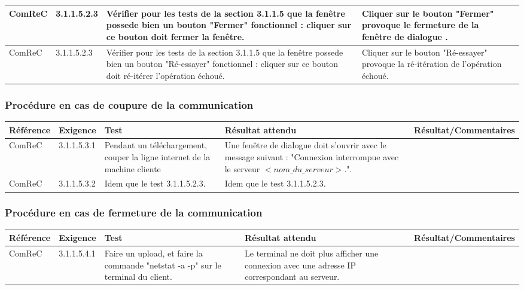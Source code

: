 \documentclass[10pt,a4paper,landscape]{report}
\begin{document}
\begin{center}
\begin{tabular}{|p{2.5cm}|p{2cm}|p{8cm}|p{8cm}|p{5.5cm}|}
		\hline
		ComReC & 3.1.1.5.2.3 & Vérifier pour les tests de la section 3.1.1.5 que la fenêtre possede bien un bouton "Fermer" fonctionnel :  cliquer sur ce bouton doit fermer la fenêtre.& Cliquer sur le bouton "Fermer" provoque le fermeture de la fenêtre de dialogue .&\\
		\hline
		ComReC & 3.1.1.5.2.3 & Vérifier pour les tests de la section 3.1.1.5 que la fenêtre possede bien un bouton "Ré-essayer" fonctionnel :  cliquer sur ce bouton doit ré-itérer l'opération échoué.& Cliquer sur le bouton "Ré-essayer" provoque la ré-itération de l'opération échoué.&\\
		\hline
	\end{tabular}
	\egroup
\end{center}

\subsubsection{Procédure en cas de coupure de la communication}

\begin{center}
	\bgroup
	\def\arraystretch{1.5}
	\begin{tabular}{|p{2.5cm}|p{2cm}|p{8cm}|p{8cm}|p{5.5cm}|}
		\hline
		\rowcolor{gris}Référence & Exigence & Test & Résultat attendu & Résultat/Commentaires\\
		\hline
		ComReC & 3.1.1.5.3.1 & Pendant un téléchargement, couper la ligne internet de la machine cliente & Une fenêtre de dialogue doit s'ouvrir avec le message suivant :   "Connexion interrompue avec le serveur $< nom\_du\_serveur>$.".&\\
		\hline
		ComReC & 3.1.1.5.3.2 & Idem que le test 3.1.1.5.2.3. & Idem que le test 3.1.1.5.2.3.\\
		\hline
	\end{tabular}
	\egroup
\end{center}

\subsubsection{Procédure en cas de fermeture de la communication}

\begin{center}
	\bgroup
	\def\arraystretch{1.5}
	\begin{tabular}{|p{2.5cm}|p{2cm}|p{8cm}|p{8cm}|p{5.5cm}|}
		\hline
		\rowcolor{gris}Référence & Exigence & Test & Résultat attendu & Résultat/Commentaires\\
		\hline
		ComReC & 3.1.1.5.4.1 & Faire un upload, et faire la commande "netstat -a -p" sur le terminal du client. & Le terminal ne doit plus afficher une connexion avec une adresse IP correspondant au serveur.&\\
		\hline
	\end{tabular}
	\egroup
\end{center}
\end{document}
